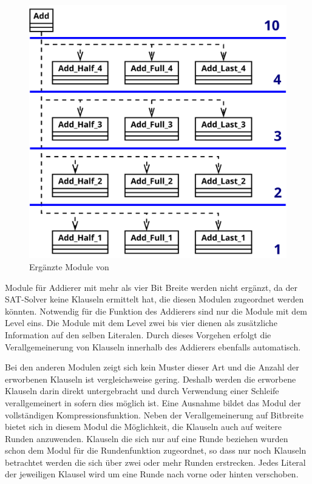 \begin{figure}[!h]
  \centering
  \includegraphics[scale=0.265]{images/module_add}
  \caption{Ergänzte Module von }
  \label{fig:sha256_module_add}
\end{figure}

Module für Addierer mit mehr als vier Bit Breite werden nicht ergänzt, da der SAT-Solver keine Klauseln ermittelt hat, die diesen Modulen zugeordnet werden könnten.  
Notwendig für die Funktion des Addierers sind nur die Module mit dem Level eins. Die Module mit dem Level zwei bis vier dienen als zusätzliche Information
auf den selben Literalen. Durch dieses Vorgehen erfolgt die Verallgemeinerung von Klauseln innerhalb des Addierers ebenfalls automatisch.

Bei den anderen Modulen zeigt sich kein Muster dieser Art und die Anzahl der erworbenen Klauseln ist vergleichsweise gering. Deshalb werden die erworbene Klauseln
darin direkt untergebracht und durch Verwendung einer Schleife verallgemeinert in sofern dies möglich ist. Eine Ausnahme bildet das Modul der vollständigen
Kompressionsfunktion. Neben der Verallgemeinerung auf Bitbreite bietet sich in diesem Modul die Möglichkeit, die Klauseln auch auf weitere Runden anzuwenden.
Klauseln die sich nur auf eine Runde beziehen wurden schon dem Modul für die Rundenfunktion zugeordnet, so dass nur noch Klauseln betrachtet werden die sich über
zwei oder mehr Runden erstrecken. Jedes Literal der jeweiligen Klausel wird um eine Runde nach vorne oder hinten verschoben.

